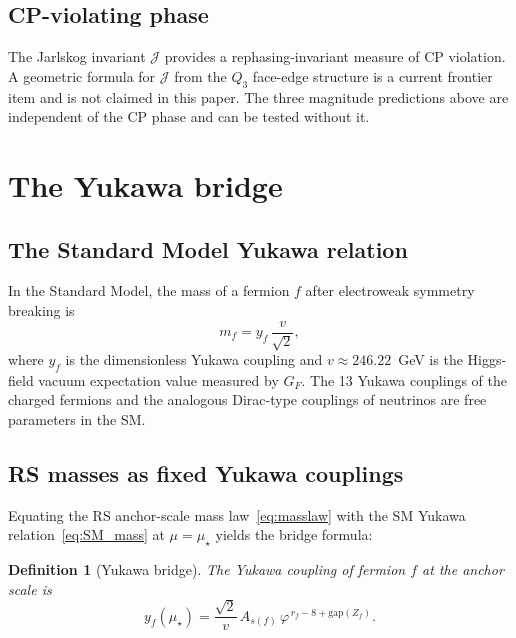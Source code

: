\documentclass[11pt]{article}
\newtheorem{definition}[theorem]{Definition}
\theoremstyle{remark}
\newcommand{\phig}{\varphi}
\newcommand{\mustar}{\mu_\star}
\begin{document}
\subsection{CP-violating phase}

The Jarlskog invariant $\mathcal{J}$ provides a
rephasing-invariant measure of CP violation.  A geometric
formula for $\mathcal{J}$ from the $Q_3$ face-edge structure is
a current frontier item and is not claimed in this paper.
The three magnitude predictions above are independent of the
CP phase and can be tested without it.

\section{The Yukawa bridge}
\label{sec:yukawa}

\subsection{The Standard Model Yukawa relation}

In the Standard Model, the mass of a fermion $f$ after
electroweak symmetry breaking is
\begin{equation}\label{eq:SM_mass}
  m_f = y_f\,\frac{v}{\sqrt{2}},
\end{equation}
where $y_f$ is the dimensionless Yukawa coupling and
$v\approx 246.22$~GeV is the Higgs-field vacuum expectation
value measured by $G_F$.  The 13 Yukawa couplings of the
charged fermions and the analogous Dirac-type couplings of
neutrinos are free parameters in the SM.

\subsection{RS masses as fixed Yukawa couplings}

Equating the RS anchor-scale mass
law~\eqref{eq:masslaw} with the SM Yukawa
relation~\eqref{eq:SM_mass} at $\mu=\mustar$ yields the
bridge formula:

\begin{definition}[Yukawa bridge]\label{def:bridge}
The Yukawa coupling of fermion $f$ at the anchor scale is
\begin{equation}\label{eq:bridge}
  y_f(\mustar)
  = \frac{\sqrt{2}}{v}\,
    A_{s(f)}\,\phig^{\,r_f - 8 + \mathrm{gap}(Z_f)}.
\end{equation}
\end{definition}
\end{document}
